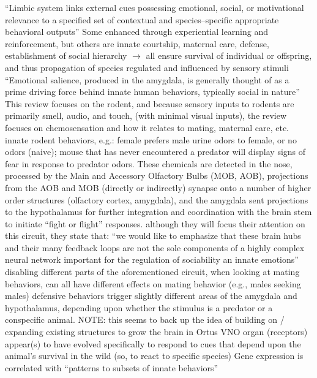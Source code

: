 \documentclass[11pt, a4paper, oneside]{article}   	%
\begin{document}
\begin{outline}
  \point ``Limbic system links external cues possessing emotional, social, or motivational relevance to a specified set of contextual and species--specific appropriate behavioral outputs''
  \point Some enhanced through experiential learning and reinforcement, but others are innate
    \subpoint courtship, maternal care, defense, establishment of social hierarchy $\rightarrow$ all ensure survival of individual or offspring, and thus propagation of species
    \subpoint regulated and influenced by sensory stimuli
  \point ``Emotional salience, produced in the amygdala, is generally thought of as a prime driving force behind innate human behaviors, typically social in nature''
  \point This review focuses on the rodent, and because sensory inputs to rodents are primarily smell, audio, and touch, (with minimal visual inputs), the review focuses on chemosensation and how it relates to mating, maternal care, etc.
  \point innate rodent behaviors, e.g.: female prefers male urine odors to female, or no odors (naive); mouse that has never encountered a predator will display signs of fear in response to predator odors.
  \subpoint These chemicals are detected in the nose, processed by the Main and Accessory Olfactory Bulbs (MOB, AOB), projections from the AOB and MOB (directly or indirectly) synapse onto a number of higher order structures (olfactory cortex, amygdala), and the amygdala sent projections to the hypothalamus for further integration and coordination with the brain stem to initiate ``fight or flight'' responses.
      \subsubpoint although they will focus their attention on this circuit, they state that: ``we would like to emphasize that these brain hubs and their many feedback loops are not the sole components of a highly complex neural network important for the regulation of sociability an innate emotions''
  \point disabling different parts of the aforementioned circuit, when looking at mating behaviors, can all have different effects on mating behavior (e.g., males seeking males)
  \point defensive behaviors trigger slightly different areas of the amygdala and hypothalamus, depending upon whether the stimulus is a predator or a conspecific animal.
    \subpoint NOTE: this seems to back up the idea of building on / expanding existing structures to grow the brain in Ortus
  \point VNO organ (receptors) appear(s) to have evolved specifically to respond to cues that depend upon the animal's survival in the wild (so, to react to specific species)
  \point Gene expression is correlated with ``patterns to subsets of innate behaviors''

\end{outline}
\end{document}
